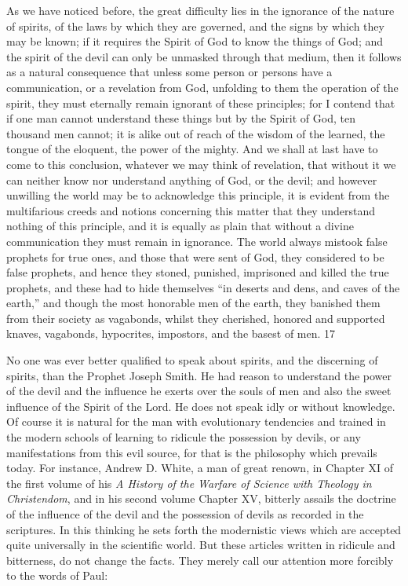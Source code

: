 As we have noticed before, the great difficulty lies in the ignorance of the nature of spirits, of
the laws by which they are governed, and the signs by which they may be known; if it
requires the Spirit of God to know the things of God; and the spirit of the devil can only be
unmasked through that medium, then it follows as a natural consequence that unless some
person or persons have a communication, or a revelation from God, unfolding to them the
operation of the spirit, they must eternally remain ignorant of these principles; for I contend
that if one man cannot understand these things but by the Spirit of God, ten thousand men
cannot; it is alike out of reach of the wisdom of the learned, the tongue of the eloquent, the
power of the mighty. And we shall at last have to come to this conclusion, whatever we may
think of revelation, that without it we can neither know nor understand anything of God, or
the devil; and however unwilling the world may be to acknowledge this principle, it is
evident from the multifarious creeds and notions concerning this matter that they understand
nothing of this principle, and it is equally as plain that without a divine communication they
must remain in ignorance. The world always mistook false prophets for true ones, and those
that were sent of God, they considered to be false prophets, and hence they stoned, punished,
imprisoned and killed the true prophets, and these had to hide themselves ``in deserts and
dens, and caves of the earth,'' and though the most honorable men of the earth, they banished
them from their society as vagabonds, whilst they cherished, honored and supported knaves,
vagabonds, hypocrites, impostors, and the basest of men. 17

No one was ever better qualified to speak about spirits, and the discerning of spirits, than the
Prophet Joseph Smith. He had reason to understand the power of the devil and the influence
he exerts over the souls of men and also the sweet influence of the Spirit of the Lord. He does
not speak idly or without knowledge. Of course it is natural for the man with evolutionary
tendencies and trained in the modern schools of learning to ridicule the possession by devils,
or any manifestations from this evil source, for that is the philosophy which prevails today.
For instance, Andrew D. White, a man of great renown, in Chapter XI of the first volume of
his \textit{A History of the Warfare of Science with Theology in Christendom}, and in his second
volume Chapter XV, bitterly assails the doctrine of the influence of the devil and the
possession of devils as recorded in the scriptures. In this thinking he sets forth the
modernistic views which are accepted quite universally in the scientific world. But these
articles written in ridicule and bitterness, do not change the facts. They merely call our
attention more forcibly to the words of Paul:

